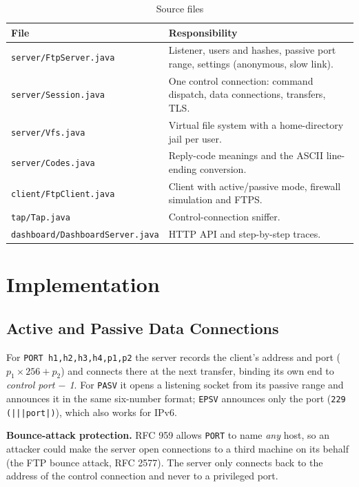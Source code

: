 \documentclass[11pt,a4paper]{article}
\begin{document}
\begin{table}[H]
\centering
\caption{Source files}
\small
\begin{tabularx}{\textwidth}{@{}lY@{}}
\toprule
\textbf{File} & \textbf{Responsibility} \\ \midrule
\texttt{server/FtpServer.java} & Listener, users and hashes, passive port range, settings (anonymous, slow link). \\
\texttt{server/Session.java} & One control connection: command dispatch, data connections, transfers, TLS. \\
\texttt{server/Vfs.java} & Virtual file system with a home-directory jail per user. \\
\texttt{server/Codes.java} & Reply-code meanings and the ASCII line-ending conversion. \\
\texttt{client/FtpClient.java} & Client with active/passive mode, firewall simulation and FTPS. \\
\texttt{tap/Tap.java} & Control-connection sniffer. \\
\texttt{dashboard/DashboardServer.java} & HTTP API and step-by-step traces. \\ \bottomrule
\end{tabularx}
\end{table}

\section{Implementation}

\subsection{Active and Passive Data Connections}
For \texttt{PORT h1,h2,h3,h4,p1,p2} the server records the client's address and port ($p_1 \times 256 + p_2$) and connects there at the next transfer, binding its own end to \emph{control port $-$ 1}. For \texttt{PASV} it opens a listening socket from its passive range and announces it in the same six-number format; \texttt{EPSV} announces only the port (\texttt{229 (|||port|)}), which also works for IPv6.

\textbf{Bounce-attack protection.} RFC 959 allows \texttt{PORT} to name \emph{any} host, so an attacker could make the server open connections to a third machine on its behalf (the FTP bounce attack, RFC 2577). The server only connects back to the address of the control connection and never to a privileged port.
\end{document}
